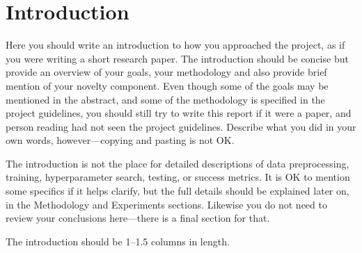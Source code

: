 \section{Introduction}

Here you should write an introduction to how you approached the project,
as if you were writing a short research paper.
The introduction should be concise but provide an overview of your
goals, your methodology and also provide brief mention of your novelty component.
Even though some of the goals may be mentioned in the abstract,
and some of the methodology is specified in the project guidelines,
you should still try to write this report if it were a paper,
and person reading had not seen the project guidelines.
Describe what you did in your own words, however---copying and pasting is not OK.

The introduction is not the place for detailed descriptions of data preprocessing,
training, hyperparameter search, testing, or success metrics.
It is OK to mention some specifics if it helps clarify, but the full details
should be explained later on, in the Methodology and Experiments sections.
Likewise you do not need to review your conclusions here---there
is a final section for that.

The introduction should be 1--1.5 columns in length.